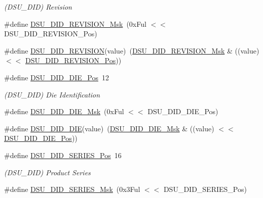 \begin{DoxyCompactItemize}
\begin{DoxyCompactList}\small\item\em (D\+S\+U\+\_\+\+D\+ID) Revision \end{DoxyCompactList}\item 
\#define \mbox{\hyperlink{group___s_a_m_d21___d_s_u_gab5dba5b8a06073b6c8a2cdffe5b4fc20}{D\+S\+U\+\_\+\+D\+I\+D\+\_\+\+R\+E\+V\+I\+S\+I\+O\+N\+\_\+\+Msk}}~(0x\+Ful $<$$<$ D\+S\+U\+\_\+\+D\+I\+D\+\_\+\+R\+E\+V\+I\+S\+I\+O\+N\+\_\+\+Pos)
\item 
\#define \mbox{\hyperlink{group___s_a_m_d21___d_s_u_ga1c662b22d53f1e09610c2c4df24e26d8}{D\+S\+U\+\_\+\+D\+I\+D\+\_\+\+R\+E\+V\+I\+S\+I\+ON}}(value)~(\mbox{\hyperlink{group___s_a_m_d21___d_s_u_gab5dba5b8a06073b6c8a2cdffe5b4fc20}{D\+S\+U\+\_\+\+D\+I\+D\+\_\+\+R\+E\+V\+I\+S\+I\+O\+N\+\_\+\+Msk}} \& ((value) $<$$<$ \mbox{\hyperlink{group___s_a_m_d21___d_s_u_gadf8c7ee986cf2cceec0a4d82efb513a2}{D\+S\+U\+\_\+\+D\+I\+D\+\_\+\+R\+E\+V\+I\+S\+I\+O\+N\+\_\+\+Pos}}))
\item 
\#define \mbox{\hyperlink{group___s_a_m_d21___d_s_u_gacd344f630eefc7e02ceb5f8210017b8b}{D\+S\+U\+\_\+\+D\+I\+D\+\_\+\+D\+I\+E\+\_\+\+Pos}}~12
\begin{DoxyCompactList}\small\item\em (D\+S\+U\+\_\+\+D\+ID) Die Identification \end{DoxyCompactList}\item 
\#define \mbox{\hyperlink{group___s_a_m_d21___d_s_u_ga41443f7e74fd63e24f7990557d9ebb28}{D\+S\+U\+\_\+\+D\+I\+D\+\_\+\+D\+I\+E\+\_\+\+Msk}}~(0x\+Ful $<$$<$ D\+S\+U\+\_\+\+D\+I\+D\+\_\+\+D\+I\+E\+\_\+\+Pos)
\item 
\#define \mbox{\hyperlink{group___s_a_m_d21___d_s_u_gadcbee73ae2aeed99b44050be79c41b6d}{D\+S\+U\+\_\+\+D\+I\+D\+\_\+\+D\+IE}}(value)~(\mbox{\hyperlink{group___s_a_m_d21___d_s_u_ga41443f7e74fd63e24f7990557d9ebb28}{D\+S\+U\+\_\+\+D\+I\+D\+\_\+\+D\+I\+E\+\_\+\+Msk}} \& ((value) $<$$<$ \mbox{\hyperlink{group___s_a_m_d21___d_s_u_gacd344f630eefc7e02ceb5f8210017b8b}{D\+S\+U\+\_\+\+D\+I\+D\+\_\+\+D\+I\+E\+\_\+\+Pos}}))
\item 
\#define \mbox{\hyperlink{group___s_a_m_d21___d_s_u_ga7f9f64f65c0ec3d507ba5bc03b1a9b68}{D\+S\+U\+\_\+\+D\+I\+D\+\_\+\+S\+E\+R\+I\+E\+S\+\_\+\+Pos}}~16
\begin{DoxyCompactList}\small\item\em (D\+S\+U\+\_\+\+D\+ID) Product Series \end{DoxyCompactList}\item 
\#define \mbox{\hyperlink{group___s_a_m_d21___d_s_u_gaf0a694364add4f49a3d7ad19af011e0b}{D\+S\+U\+\_\+\+D\+I\+D\+\_\+\+S\+E\+R\+I\+E\+S\+\_\+\+Msk}}~(0x3\+Ful $<$$<$ D\+S\+U\+\_\+\+D\+I\+D\+\_\+\+S\+E\+R\+I\+E\+S\+\_\+\+Pos)
$$
\end{DoxyCompactItemize}
